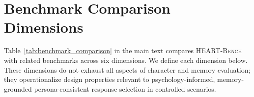 \documentclass[11pt]{article}
\newcommand{\ourbench}[0]{\textsc{HEART-Bench}\xspace}
\begin{document}




\appendix
\section{Benchmark Comparison Dimensions}
\label{app:benchmark_dims}


Table~\ref{tab:benchmark_comparison} in the main text compares \ourbench with related benchmarks across six dimensions. We define each dimension below. These dimensions do not exhaust all aspects of character and memory evaluation; they operationalize design properties relevant to psychology-informed, memory-grounded persona-consistent response selection in controlled scenarios.
\end{document}
